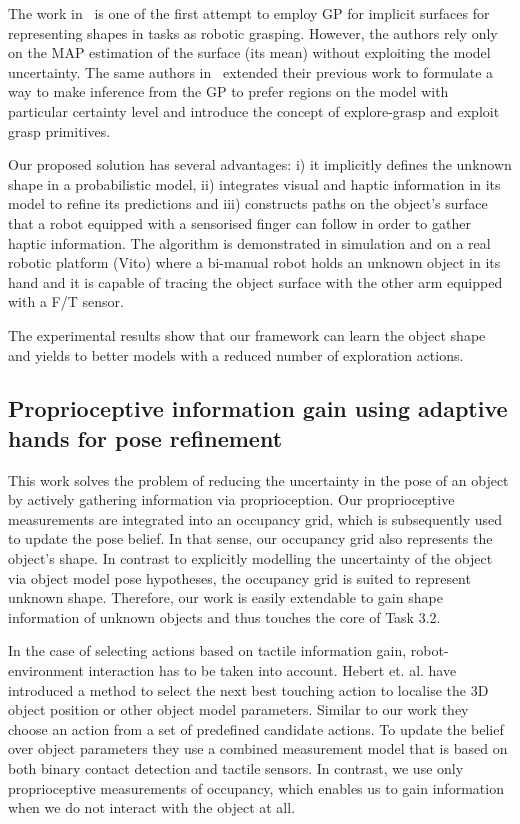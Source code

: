 \documentclass[a4paper,11pt,pdf]{../templates/pacmanreport}
\begin{document}
The work in~\cite{Dragiev2011Gaussian} is one of the first attempt to employ GP for implicit surfaces for representing shapes in tasks as robotic grasping. However, the authors rely only on the MAP estimation of the surface (its mean) without exploiting the model uncertainty. The same authors in~\cite{Dragiev2013Uncertainty} extended their previous work to formulate a way to make inference from the GP to prefer regions on the model with particular certainty level and introduce the concept of explore-grasp and exploit grasp primitives. 

Our proposed solution has several advantages: i) it implicitly defines the unknown shape in a probabilistic model, ii) integrates visual and haptic information in its model to refine its predictions and iii) constructs paths on the object's surface that a robot equipped with a sensorised finger can follow in order to gather haptic information. 
The algorithm is demonstrated in simulation and on a real robotic platform (Vito) where a bi-manual robot holds an unknown object in its hand and it is capable of tracing the object surface with the other arm equipped with a F/T sensor.

The experimental results show that our framework can learn the object shape and yields to better models with a reduced number of exploration actions.

\subsection{Proprioceptive information gain using adaptive hands for pose refinement}

This work solves the problem of reducing the uncertainty in the pose of an object by actively gathering information via proprioception.
Our proprioceptive measurements are integrated into an occupancy grid, which is subsequently used to update the pose belief.
In that sense, our occupancy grid also represents the object's shape. 
In contrast to explicitly modelling the uncertainty of the object via object model pose hypotheses, the occupancy grid is suited to 
represent unknown shape. Therefore, our work is easily extendable to gain shape information of unknown objects and thus touches the core of Task 3.2.

In the case of selecting actions based on tactile information gain, robot-environment interaction has to be taken into account. 
Hebert et. al. \cite{Hebert2013} have introduced a method to select the next best touching action to localise the 3D object position or other object model parameters.
Similar to our work they choose an action from a set of predefined candidate actions. 
To update the belief over object parameters they use a combined measurement model that is based on both binary contact detection and tactile sensors.  
In contrast, we use only proprioceptive measurements of occupancy, which enables us to gain information
when we do not interact with the object at all.
\end{document}
